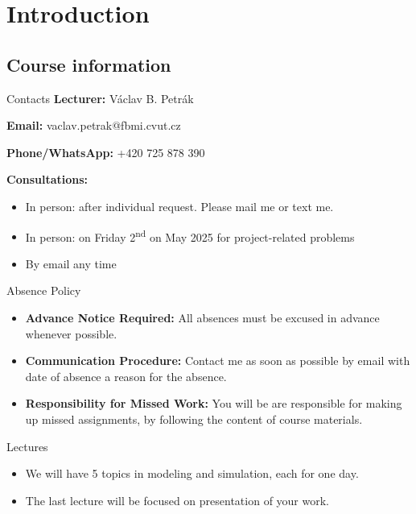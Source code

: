 \section{Introduction}
\subsection{Course information}
\begin{frame}{Contacts}
    \textbf{Lecturer:} Václav B. Petrák  

    \textbf{Email:} vaclav.petrak@fbmi.cvut.cz  

    \textbf{Phone/WhatsApp:} +420 725 878 390

    \vspace{1em}
    \textbf{Consultations:} 
    \begin{itemize}
        \item In person: after individual request. Please mail me or text me.
        \item In person: on Friday 2\textsuperscript{nd} on May 2025 for project-related problems
        \item By email any time
    \end{itemize}

\end{frame}

\begin{frame}{Absence Policy}


\begin{itemize}
    \item \textbf{Advance Notice Required:} All absences must be excused in advance whenever possible.

    \item \textbf{Communication Procedure:}  Contact me  as soon as possible by email with date of absence a reason for the absence.

    \item \textbf{Responsibility for Missed Work:} You will be are responsible for making up missed assignments, by following the content of course materials.  
\end{itemize}
 

\end{frame}


\begin{frame}{Lectures}
\Large
\begin{itemize}
    \item We will have 5 topics in modeling and simulation, each for one day.
    \item The last lecture will be focused on presentation of your work. 
\end{itemize}
\end{frame}

